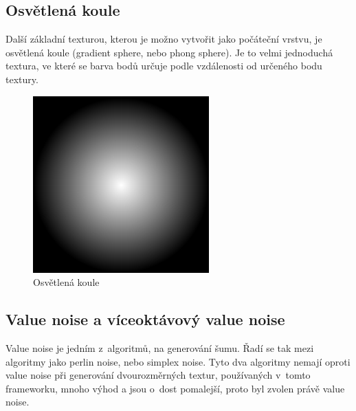 \subsection{Osvětlená koule}
Další základní texturou, kterou je možno vytvořit jako počáteční vrstvu, je osvětlená koule (gradient sphere, nebo phong sphere).
Je to velmi jednoduchá textura, ve které se barva bodů určuje podle vzdálenosti od určeného bodu textury.

\begin{figure}[h]
    \begin{center}
      \includegraphics[scale=0.65]{fig/gradTex} 
      \caption{Osvětlená koule} 
      \label{sinTex}
    \end{center}
\end{figure}

\subsection{Value noise a víceoktávový value noise}
Value noise je jedním z~algoritmů, na generování šumu.
Řadí se tak mezi algoritmy jako perlin noise, nebo simplex noise. 
Tyto dva algoritmy nemají oproti value noise při generování dvourozměrných textur, používaných v~tomto frameworku, mnoho výhod a jsou o~dost pomalejší, proto byl zvolen právě value noise.

